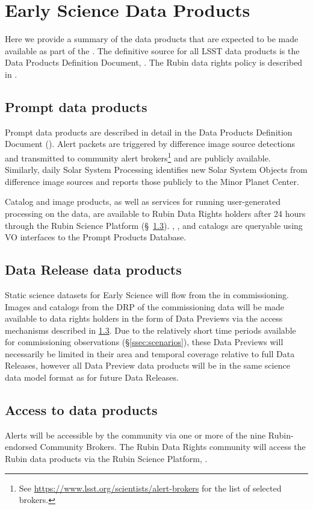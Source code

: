 \section{Early Science Data Products} 
\label{sec:data}

Here we provide a summary of the data products that are expected to be made available as part of the \esp. 
The definitive source for all LSST data products is the Data Products Definition Document, \citep{LSE-163}.
The Rubin data rights policy is described in  \cite{RDO-013}.

\subsection{Prompt data products}

Prompt data products are described in detail in the Data Products Definition Document (\DPDD).
Alert packets are triggered by difference image source detections and transmitted to community alert brokers\footnote{See \url{https://www.lsst.org/scientists/alert-brokers} for the list of selected brokers.} and are publicly available. 
Similarly, daily Solar System Processing identifies new Solar System Objects from difference image sources and reports those publicly to the Minor Planet Center.

Catalog and image products, as well as services for running user-generated processing on the data, are available to Rubin Data Rights holders after 24 hours through the Rubin Science Platform (\S~\ref{ssec:dataaccess}).
\DIASource, \DIAObject, and \SSObject catalogs are queryable using VO interfaces to the Prompt Products Database.

\subsection{Data Release data products}
Static science datasets for Early Science will flow from the \svs in commissioning.
Images and catalogs from the DRP of the commissioning data will be made available to data rights holders in the form of Data Previews via the access mechanisms described in \ref{ssec:dataaccess}.
Due to the relatively short time periods available for commissioning observations (\S \ref{ssec:scenarios}), these Data Previews will necessarily be limited in their area and temporal coverage relative to full Data Releases, however all Data Preview data products will be in the same science data model format as for future Data Releases.

\subsection{Access to \es data products}\label{ssec:dataaccess}
Alerts will be accessible by the community via one or more of the nine Rubin-endorsed Community Brokers. 
The Rubin Data Rights community will access the Rubin data products via the Rubin Science Platform, \citep{LSE-319}.

